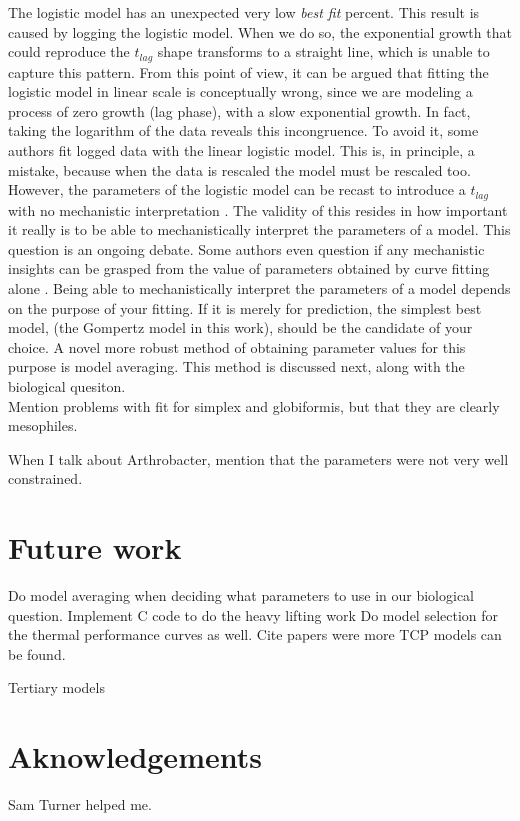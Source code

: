 \documentclass[titlepage,11pt]{article}
\begin{document}
\begin{linenumbers}
	The logistic model has an unexpected very low \textit{best fit} percent. This result is caused by logging the logistic model. When we do so, the exponential growth that could reproduce the $ t_{lag} $ shape transforms to a straight line, which is unable to capture this pattern. From this point of view, it can be argued that fitting the logistic model in linear scale is conceptually wrong, since we are modeling a process of zero growth (lag phase), with a slow exponential growth. In fact, taking the logarithm of the data reveals this incongruence. To avoid it, some authors \cite{Micha2011, Zwietering1990} fit logged data with the linear logistic model. This  is, in principle, a mistake, because when the data is rescaled the model must be rescaled too. However, the parameters of the logistic model can be recast to introduce a $ t_{lag} $ with no mechanistic interpretation \cite{Zwietering1990}. The validity of this resides in how important it really is to be able to mechanistically interpret the parameters of a model. This question is an ongoing debate. Some authors even question if any mechanistic insights can be  grasped from the value of parameters obtained by curve fitting alone \cite{Micha2011}. Being able to mechanistically interpret the parameters of a model depends on the purpose of your fitting. If it is merely for prediction, the simplest best  model, (the Gompertz model in this work), should be the candidate of your choice. A  novel more robust method of obtaining parameter values for this purpose is model averaging. This method is discussed next, along with the biological quesiton. \\
	
	Mention problems with fit for simplex and globiformis, but that they are clearly mesophiles.
	
	When I talk about Arthrobacter, mention that the parameters were not very well constrained.
	\section{Future work}
	Do model averaging when deciding what parameters to use in our biological question. Implement C code to do the heavy lifting work
	Do model selection for the thermal performance curves as well. Cite papers were more TCP models can be found.
	
	Tertiary models
	\section{Aknowledgements}
	Sam Turner helped me.
	\newpage

\end{linenumbers}
\end{document}
